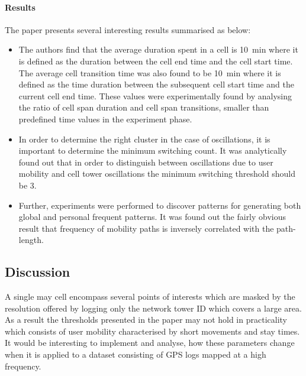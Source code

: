 \paragraph{Results}
The paper presents several interesting results summarised as below:

\begin{itemize}

	\item The authors find that the average duration spent in a cell is 10~min where it is 
	defined as the duration between the cell end time and the cell start time. The average
	cell transition time was also found to be 10~min where it is defined as the time duration
	between the subsequent cell start time and the current cell end time. These values were 
	experimentally found by analysing the ratio of cell span duration and cell span transitions,
	smaller than predefined time values in the experiment phase.  
	
	\item In order to determine the right cluster in the case of oscillations, it is important
	to determine the minimum switching count. It was analytically found out that in order to 
	distinguish between oscillations due to user mobility and cell tower oscillations the 
	minimum switching threshold should be 3. 
	
	\item Further, experiments were performed to discover patterns for generating both global
	and personal frequent patterns. It was found out the fairly obvious result that frequency 
	of mobility paths is inversely correlated with the path-length. 
	
\end{itemize}

\subsection{Discussion} \label{lect5-disc}

A single may cell encompass several points of interests which are masked by the resolution 
offered by logging only the network tower ID which covers a large area. As a result the thresholds 
presented in the paper may not hold in practicality which consists of user mobility characterised 
by short movements and stay times. It would be interesting to implement and analyse, how these
parameters change when it is applied to a dataset consisting of GPS logs mapped at a high
frequency. 
